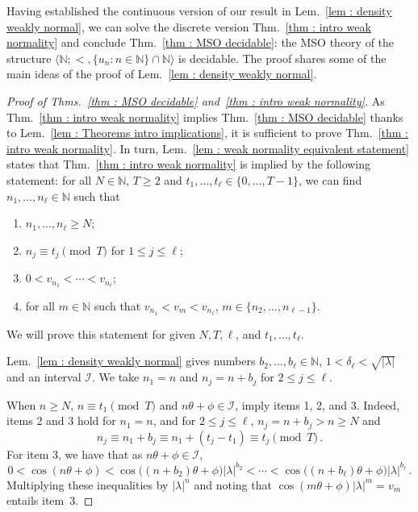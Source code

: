\documentclass[a4paper,UKenglish,cleveref, autoref, thm-restate]{lipics-v2021}
\newcommand{\nat} {\mathbb{N}}
\begin{document}
Having established the continuous version of our result in Lem.~\ref{lem :
  density weakly normal}, we can solve the discrete version
Thm.~\ref{thm : intro weak normality} and conclude Thm.~\ref{thm : MSO
  decidable}: the MSO theory of the structure $\langle \nat;<,\{u_n
\colon n \in \nat\}\cap \nat \rangle$ is decidable.
The proof shares some of the main ideas of the proof of Lem.~\ref{lem : density weakly normal}.
\begin{proof}[Proof of Thms.~\ref{thm : MSO decidable} and~\ref{thm : intro weak normality}]
    As Thm.~\ref{thm : intro weak normality} implies Thm.~\ref{thm : MSO decidable} thanks to Lem.~\ref{lem : Theorems intro implications}, it is sufficient to prove Thm.~\ref{thm : intro weak normality}. 
    In turn, Lem.~\ref{lem : weak normality equivalent statement} states that Thm.~\ref{thm : intro weak normality} is implied by the  following statement: for all $N \in \nat$, $T \ge 2$ and $t_1,\dots,t_\ell \in \{0,\dots,T-1\}$, we can find $n_1,\dots,n_\ell \in \nat$ such that
    \begin{enumerate}
        \item $n_1,\dots,n_\ell \ge N$;
        \item $n_j \equiv t_j \pmod T$ for $1 \le j \le \ell$;
        \item $0 < v_{n_1} < \cdots < v_{n_\ell}$;
        \item for all $m \in \nat$ such that $v_{n_1} < v_m < v_{n_\ell}$, $m \in \{n_2,\dots,n_{\ell-1}\}$.
    \end{enumerate}
    We will prove this statement for given $N, T, \ell$, and $t_1,\dots,t_\ell$.

    Lem.~\ref{lem : density weakly normal} gives numbers $b_2,\dots,b_\ell \in \nat$, $1 < \delta_\ell < \sqrt{|\lambda|}$ and an interval $\mathcal{I}$.
    We take $n_1 = n$ and $n_j = n + b_j$ for $2 \le j \le \ell$. 
    
    When $n \ge N$, $n \equiv t_1 \pmod T$ and $n\theta + \phi \in \mathcal{I}$, imply items 1, 2, and 3.
    Indeed, items 2 and 3 hold for $n_1 = n$, and for $2 \le j \le \ell$, $n_j = n+b_j > n \ge N$ and
    \begin{equation*}
        n_j \equiv n_1 + b_j \equiv n_1 + (t_j - t_1) \equiv t_j \pmod T \, .
    \end{equation*}
    For item 3, we have that as $n\theta + \phi \in \mathcal{I}$,
    \begin{equation*}
        0 < \cos(n\theta + \phi) < \cos\big( (n+b_2)\theta+\phi\big)|\lambda|^{b_2} <\cdots < \cos\big((n+b_\ell)\theta +\phi\big)|\lambda|^{b_\ell}\,.
    \end{equation*}
    Multiplying these inequalities by $|\lambda|^n$ and noting that
    $\cos(m\theta + \phi)|\lambda|^m = v_m$ entails item~3.


\end{proof}
\end{document}
